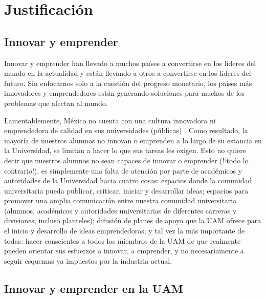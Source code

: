 \documentclass[11pt,letterpaper,titlepage]{article}
\begin{document}
\section{Justificaci\'on}
\subsection{Innovar y emprender}
Innovar y emprender han llevado a muchos pa\'ises a convertirse en los l\'ideres del mundo en la actualidad y est\'an llevando a otros a convertirse en los l\'ideres del futuro. Sin enfocarnos solo a la cuesti\'on del progreso monetario, los pa\'ises m\'as innovadores y emprendedores est\'an generando soluciones para muchos de los problemas que afectan al mundo.

Lamentablemente, M\'exico no cuenta con una cultura innovadora ni emprendedora de calidad en sus universidades (p\'ublicas) \cite{desarrollo}. Como resultado, la mayor\'ia de nuestros alumnos no innovan o emprenden a lo largo de su estancia en la Universidad, se limitan a hacer lo que sus tareas les exigen. Esto no quiere decir que nuestros alumnos no sean capaces de innovar o emprender (!`todo lo contrario!), es simplemente una falta de atenci\'on por parte de acad\'emicos y autoridades de la Universidad hacia cuatro cosas: espacios donde la comunidad universitaria pueda publicar, criticar, iniciar y desarrollar ideas; espacios para promover una amplia comunicaci\'on entre nuestra comunidad universitaria (alumnos, acad\'emicos y autoridades universitarias de diferentes carreras y divisiones, incluso planteles); difusi\'on de planes de apoyo que la UAM ofrece para el inicio y desarrollo de ideas emprendedoras; y tal vez la m\'as importante de todas: hacer conscientes a todos los miembros de la UAM de que realmente pueden orientar sus esfuerzos a innovar, a emprender, y no necesariamente a seguir esquemas ya impuestos por la industria actual.

\subsection{Innovar y emprender en la UAM}
\end{document}
